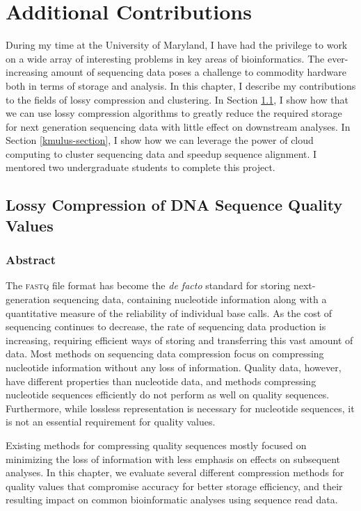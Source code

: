 
\renewcommand{\thechapter}{6}

\chapter{Additional Contributions}

During my time at the University of Maryland, I have had the privilege to work on a wide array of interesting problems in key areas of bioinformatics.
The ever-increasing amount of sequencing data poses a challenge to commodity hardware both in terms of storage and analysis.
In this chapter, I describe my contributions to the fields of lossy compression and clustering.
In Section \ref{lossy-section}, I show how that we can use lossy compression algorithms to greatly reduce the required storage for next generation sequencing data with little effect on downstream analyses.
In Section \ref{kmulus-section}, I show how we can leverage the power of cloud computing to cluster sequencing data and speedup sequence alignment.
I mentored two undergraduate students to complete this project.

\section{Lossy Compression of DNA Sequence Quality Values}
\label{lossy-section}
\subsection{Abstract}


The \textsc{fastq} file format has become the \emph{de facto} standard
for storing next-generation sequencing data, containing nucleotide
information along with a quantitative measure of the reliability of
individual base calls. As the cost of sequencing continues to
decrease, the rate of sequencing data production is increasing,
requiring efficient ways of storing and transferring this vast amount
of data. Most methods on sequencing data compression focus on
compressing nucleotide information without any loss of information.
Quality data, however, have different properties than nucleotide data,
and methods compressing nucleotide sequences efficiently do not
perform as well on quality sequences. Furthermore, while lossless
representation is necessary for nucleotide sequences, it is not an
essential requirement for quality values.

Existing methods for compressing quality sequences mostly focused on
minimizing the loss of information with less emphasis on effects on
subsequent analyses. In this chapter, we evaluate several different
compression methods for quality values that compromise accuracy for
better storage efficiency, and their resulting impact on common
bioinformatic analyses using sequence read data.

